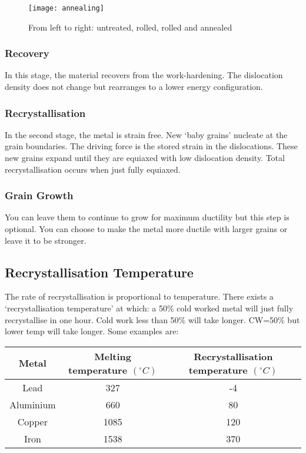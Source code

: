 \documentclass[12pt]{article}
\begin{document}
\begin{figure}[h]
  \texttt{[image: annealing]}
  \caption{From left to right: untreated, rolled, rolled and annealed}
\end{figure}

\subsubsection{Recovery}
In this stage, the material recovers from the work-hardening. 
The dislocation density does not change but rearranges to a lower energy configuration.

\subsubsection{Recrystallisation}
In the second stage, the metal is strain free.
New `baby grains' nucleate at the grain boundaries.
The driving force is the stored strain in the dislocations.
These new grains expand until they are equiaxed with low dislocation density.
Total recrystallisation occurs when just fully equiaxed.

\subsubsection{Grain Growth}
You can leave them to continue to grow for maximum ductility but this step is optional. 
You can choose to make the metal more ductile with larger grains or leave it to be stronger.

\subsection{Recrystallisation Temperature}
The rate of recrystallisation is proportional to temperature. 
There exists a `recrystallisation temperature' at which: a 50\% cold worked metal will just fully recrystallise in one hour.
Cold work less than 50\% will take longer. CW=50\% but lower temp will take longer.
Some examples are:

\begin{tabular}{c|c|c}
  Metal & Melting temperature $(^\circ C)$ & Recrystallisation temperature $(^\circ C)$ \\
  \hline
  Lead & 327 & -4 \\
  Aluminium & 660 & 80 \\
  Copper & 1085 & 120 \\
  Iron & 1538 & 370 \\
\end{tabular}
\end{document}
